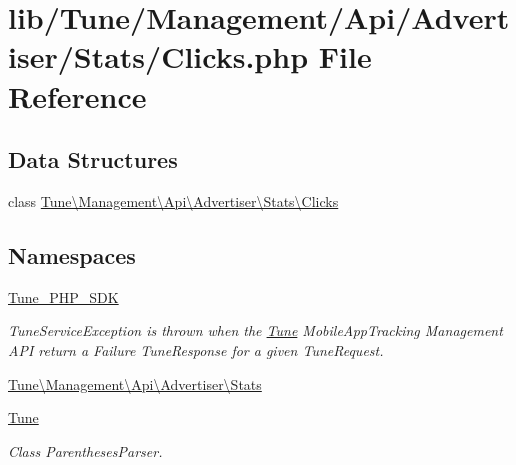 \hypertarget{Clicks_8php}{\section{lib/\-Tune/\-Management/\-Api/\-Advertiser/\-Stats/\-Clicks.php File Reference}
\label{Clicks_8php}
}
\subsection*{Data Structures}
\begin{DoxyCompactItemize}
\item 
class \hyperlink{classTune_1_1Management_1_1Api_1_1Advertiser_1_1Stats_1_1Clicks}{Tune\textbackslash{}\-Management\textbackslash{}\-Api\textbackslash{}\-Advertiser\textbackslash{}\-Stats\textbackslash{}\-Clicks}
\end{DoxyCompactItemize}
\subsection*{Namespaces}
\begin{DoxyCompactItemize}
\item 
\hyperlink{namespaceTune__PHP__SDK}{Tune\-\_\-\-P\-H\-P\-\_\-\-S\-D\-K}
\begin{DoxyCompactList}\small\item\em Tune\-Service\-Exception is thrown when the \hyperlink{namespaceTune}{Tune} Mobile\-App\-Tracking Management A\-P\-I return a Failure Tune\-Response for a given Tune\-Request. \end{DoxyCompactList}\item 
\hyperlink{namespaceTune_1_1Management_1_1Api_1_1Advertiser_1_1Stats}{Tune\textbackslash{}\-Management\textbackslash{}\-Api\textbackslash{}\-Advertiser\textbackslash{}\-Stats}
\item 
\hyperlink{namespaceTune}{Tune}
\begin{DoxyCompactList}\small\item\em Class Parentheses\-Parser. \end{DoxyCompactList}\end{DoxyCompactItemize}
